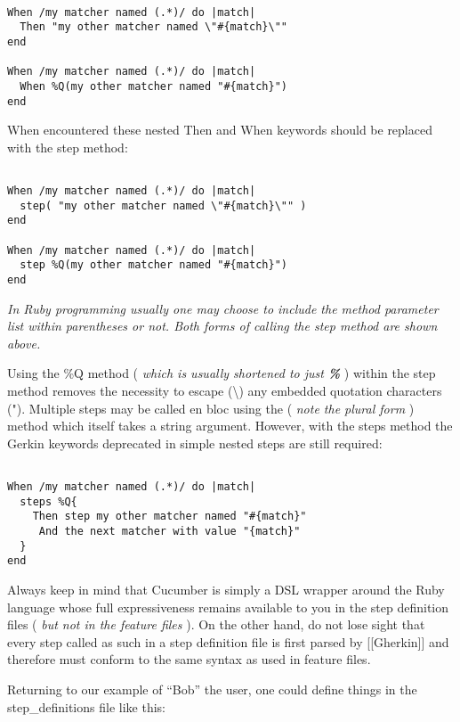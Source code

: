 \documentclass[10pt]{book}
\begin{document}
\begin{verbatim}

When /my matcher named (.*)/ do |match|
  Then "my other matcher named \"#{match}\""
end

When /my matcher named (.*)/ do |match|
  When %Q(my other matcher named "#{match}")
end

\end{verbatim}
When encountered these nested Then and When keywords should be replaced with the step method:

\begin{verbatim}

When /my matcher named (.*)/ do |match|
  step( "my other matcher named \"#{match}\"" )
end

When /my matcher named (.*)/ do |match|
  step %Q(my other matcher named "#{match}")
end

\end{verbatim}
\emph{In Ruby programming usually one may choose to include the method parameter list within parentheses or not.  Both forms of calling the step method are shown above.}

Using the \%Q method ( \emph{which is usually shortened to just \textbf{\%}} ) within the step method removes the necessity to escape (\textbackslash{}) any embedded quotation characters (").  Multiple steps may be called en bloc using the \textbf{\verb@steps@} ( \emph{note the plural form} ) method which itself takes a string argument.  However, with the steps method the Gerkin keywords deprecated in simple nested steps are still required:
\begin{verbatim}

When /my matcher named (.*)/ do |match|
  steps %Q{
    Then step my other matcher named "#{match}" 
     And the next matcher with value "{match}"
  }
end

\end{verbatim}

Always keep in mind that Cucumber is simply a DSL wrapper around the Ruby language whose full expressiveness remains available to you in the step definition files ( \emph{but not in the feature files} ).  On the other hand, do not lose sight that every step called as such in a step definition file is first parsed by [[Gherkin]] and therefore must conform to the same syntax as used in feature files.

Returning to our example of ``Bob'' the user, one could define things in the step\_definitions file like this:
\end{document}
